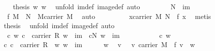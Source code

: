 \begin{isabellebody}
\ {}\ \isamarkupfalse%
\ {\isachardoublequoteopen}{\isacharquery}thesis\ w{}\ w{}{\isachardoublequoteclose}\ \isamarkupfalse%
\ {\isacharparenleft}unfold\ im{\isacharunderscore}def\ image{\isacharunderscore}def{\isacharcomma}\ auto{\isacharparenright}\isanewline
\ \ \isamarkupfalse%
\isanewline
\ \ \isamarkupfalse%
\ {}{\isacharcolon}\ {\isachardoublequoteopen}\ {\isasymzero}\isactrlbsub N\isactrlesub \ {\isasymin}\ im{\isachardoublequoteclose}\isanewline
\ \ \isamarkupfalse%
\ {\isacharminus}\isanewline
\ \ \ \ \isamarkupfalse%
\ {}{\isacharcolon}\ {\isachardoublequoteopen}f\ {\isasymzero}\isactrlbsub M\isactrlesub \ {\isacharequal}\ {\isasymzero}\isactrlbsub N\isactrlesub \ {\isasymand}\ {\isasymzero}\isactrlbsub M\isactrlesub {\isasymin}carrier\ M{\isachardoublequoteclose}\ \isamarkupfalse%
\ auto\isanewline
\ \ \ \ \isamarkupfalse%
\ {}\ \isamarkupfalse%
\ {}{\isacharcolon}\ {\isachardoublequoteopen}{\isasymexists}x{\isasymin}carrier\ M{\isachardot}\ {\isasymzero}\isactrlbsub N\isactrlesub \ {\isacharequal}\ f\ x{\isachardoublequoteclose}\ \isamarkupfalse%
\ metis\isanewline
\ \ \ \ \isamarkupfalse%
\ {}\ \isamarkupfalse%
\ {\isacharquery}thesis\ \isamarkupfalse%
\ {\isacharparenleft}unfold\ im{\isacharunderscore}def\ image{\isacharunderscore}def{\isacharcomma}\ auto{\isacharparenright}\isanewline
\ \ \isamarkupfalse%
\isanewline
\ \ \isamarkupfalse%
\ {}{\isacharcolon}\ {\isachardoublequoteopen}{\isasymAnd}c\ w{\isachardot}\ {\isasymlbrakk}c\ {\isasymin}\ carrier\ R{\isacharsemicolon}\ w\ {\isasymin}\ im{\isasymrbrakk}\ {\isasymLongrightarrow}\ c{\isasymodot}\isactrlbsub N\isactrlesub \ w\ {\isasymin}\ im{\isachardoublequoteclose}\ \isanewline
\ \ \isamarkupfalse%
\ {\isacharminus}\isanewline
\ \ \ \ \isamarkupfalse%
\ c\ w\isanewline
\ \ \ \ \isamarkupfalse%
\ c{\isacharcolon}\ {\isachardoublequoteopen}c\ {\isasymin}\ carrier\ R{\isachardoublequoteclose}\ \ w{\isacharcolon}\ {\isachardoublequoteopen}w\ {\isasymin}\ im{\isachardoublequoteclose}\isanewline
\ \ \ \ \isamarkupfalse%
\ w\ \isamarkupfalse%
\ v\ \ {}{}{\isacharcolon}\ {\isachardoublequoteopen}v{\isasymin}\ carrier\ M\ {\isasymand}\ f\ v\ {\isacharequal}\ w{\isachardoublequoteclose}\ \isamarkupfalse%

\end{isabellebody}
